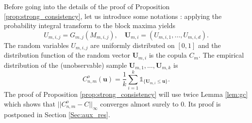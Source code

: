 \documentclass[11pt]{article}
\theoremstyle{definition}
\begin{document}
	Before going into the details of the proof of Proposition \ref{prop:strong_consistency}, let us introduce some notations : applying the probability integral transform to the block maxima yields
	\begin{equation}
		\label{eq:prob_int_tra}
		U_{m,i,j} = G_{m,j}(M_{m,i,j}), \quad \textbf{U}_{m,i} = (U_{m,i,1},\dots, U_{m,i,d}).
	\end{equation}
	The random variables $U_{m,i,j}$ are uniformly distributed on $[0,1]$ and the distribution function of the random vector $\textbf{U}_{m,i}$ is the copula $C_m$. The empirical distribution of the (unobservable) sample $\textbf{U}_{m,1},\dots, \textbf{U}_{m,k}$ is
	\begin{equation*}
		C_{n,m}^o(\textbf{u}) = \frac{1}{k} \sum_{i=1}^k \mathds{1}_{\{\textbf{U}_{m,i} \leq \textbf{u}\}}.
	\end{equation*}	
	The proof of Proposition \ref{prop:strong_consistency} will use twice Lemma \ref{lem:gc} which shows that $||C_{n,m}^o - C||_{\infty}$ converges almost surely to $0$. Its proof is postponed in Section \ref{Sec:aux_res}.
\end{document}
